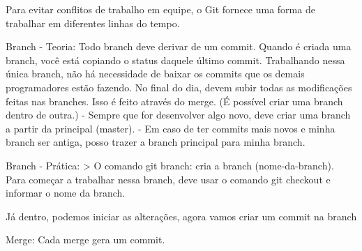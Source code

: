 Para evitar conflitos de trabalho em equipe, o Git fornece uma forma de trabalhar em diferentes linhas do tempo.

Branch - Teoria: Todo branch deve derivar de um commit. 
Quando é criada uma branch, você está copiando o status daquele último commit.
Trabalhando nessa única branch, não há necessidade de baixar os commits que os demais programadores estão fazendo.
No final do dia, devem subir todas as modificações feitas nas branches. Isso é feito através do merge.
(É possível criar uma branch dentro de outra.)
 - Sempre que for desenvolver algo novo, deve criar uma branch a partir da principal (master).
 - Em caso de ter commits mais novos e minha branch ser antiga, posso trazer a branch principal
   para minha branch.

Branch - Prática: 
> O comando git branch: cria a branch (nome-da-branch). Para começar a trabalhar nessa branch, deve usar o comando
git checkout e informar o nome da branch.

    Já dentro, podemos iniciar as alterações, agora vamos criar um commit na branch

Merge: Cada merge gera um commit.